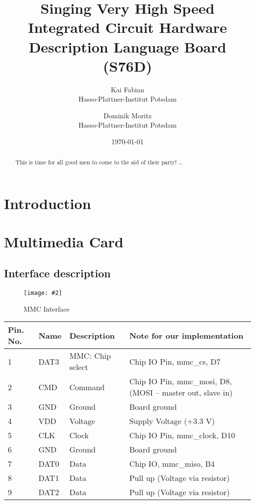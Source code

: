 \documentclass[12pt, a4paper]{article}
\title{Singing Very High Speed Integrated Circuit Hardware Description Language Board (S76D)}
\author{
        Kai Fabian \\
        Hasso-Plattner-Institut Potsdam\\
            \and
        Dominik Moritz \\
        Hasso-Plattner-Institut Potsdam\\
}
\date{\today}
\newcommand{\image}[4]{
	\begin{figure}[#4]               %
		\centering                     %
		\texttt{[image: \#2]} %
		\caption{#3}                   %
		\label{fig:#2}                 %
	\end{figure}                     %
}
\begin{document}
\maketitle

\begin{abstract}
This is time for all good men to come to the aid of their party! \ldots
\end{abstract}

\tableofcontents

\section{Introduction}

\section{Multimedia Card}

\subsection{Interface description}

\image{0.3\textwidth}{../mmc_pins.png}{MMC Interface}{ht}

\begin{table}
    \begin{tabular}{|l|l|l|p{8cm}|}
    \hline
Pin. No.   & Name    & Description	    & Note for our implementation \\ \hline
1	       & DAT3	 & MMC: Chip select & Chip IO Pin, mmc\_cs, D7 \\
2	       & CMD	 & Command 	        & Chip IO Pin,  mmc\_mosi, D8, (MOSI – master out, slave in) \\
3	       & GND	 & Ground	        & Board ground \\
4	       & VDD	 & Voltage	        & Supply Voltage (+3.3 V) \\
5	       & CLK	 & Clock	        & Chip IO Pin,  mmc\_clock, D10 \\
6	       & GND	 & Ground	        & Board ground \\
7	       & DAT0	 & Data	            & Chip IO,  mmc\_miso, B4 \\
8	       & DAT1	 & Data	            & Pull up (Voltage via resistor) \\
9	       & DAT2	 & Data	            & Pull up (Voltage via resistor) \\
	\hline
    \end{tabular}
\end{table}
\end{document}
